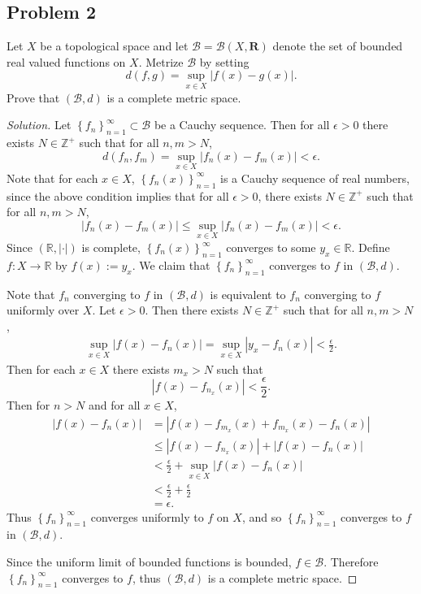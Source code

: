 \documentclass[12pt]{article}
\newcommand{\z}{\mathbb{Z}}
\newcommand{\real}{\mathbb{R}}
\newcommand\setb[1]{\left \{ #1 \right \}}
\theoremstyle{definition}
\begin{document}
\subsection{Problem 2}
Let $X$ be a topological space and let $\mathcal{B} = \mathcal{B}(X,\mathbf{R})$ denote the set of bounded real valued functions on $X$. Metrize $\mathcal{B}$ by setting 
\[
    d(f,g) = \sup\limits_{x \in X} |f(x) - g(x)|.
\]
Prove that $(\mathcal{B},d)$ is a complete metric space.
\begin{proof}[Solution]
    Let $\setb{ f_n }_{n = 1}^{\infty} \subset \mathcal{B}$ be a Cauchy sequence. Then for all $\epsilon > 0$ there exists $N \in \z^+$ such that for all $n , m > N$, 
    \[
        d(f_n , f_m) = \sup\limits_{x \in X} \left| f_n(x) - f_m(x) \right| < \epsilon.
    \]
    Note that for each $x \in X$, $\setb{ f_n(x) }_{n = 1}^{\infty}$ is a Cauchy sequence of real numbers, since the above condition implies that for all $\epsilon > 0$, there exists $N \in \z^+$ such that for all $n , m > N$,
    \[
        | f_n(x) - f_m(x) | \leq \sup\limits_{x \in X} \left| f_n(x) - f_m(x) \right| < \epsilon.
    \]
    Since $(\real, | \cdot |)$ is complete, $\setb{ f_n(x) }_{n = 1}^{\infty}$ converges to some $y_x \in \real$. Define $f : X \to \real$ by $f(x) := y_x$. We claim that $\setb{ f_n }_{n=1}^{\infty}$ converges to $f$ in $(\mathcal{B},d)$. 
    
    Note that $f_n$ converging to $f$ in $(\mathcal{B},d)$ is equivalent to $f_n$ converging to $f$ uniformly over $X$. Let $\epsilon > 0$. Then there exists $N \in \z^+$ such that for all $n , m > N$, 
    \begin{align*}
        \sup\limits_{x \in X} | f(x) - f_n(x) | = \sup\limits_{x \in X} | y_x - f_n(x) | < \frac{\epsilon}{2}.
    \end{align*}
    Then for each $x \in X$ there exists $m_x > N$ such that
    \[
        \left| f(x) - f_{n_x}(x) \right| < \frac{\epsilon}{2}.
    \]
    Then for $n > N$ and for all $x \in X$,
    \begin{align*}
        | f(x) - f_n(x) | & = \left| f(x) - f_{m_x}(x)  + f_{m_x}(x) - f_n(x) \right| \\
        & \leq \left| f(x) - f_{n_x}(x) \right| + | f(x) - f_n(x) | \\
        & < \frac{\epsilon}{2} + \sup\limits_{x \in X} | f(x) - f_n(x) | \\
        & < \frac{\epsilon}{2} + \frac{\epsilon}{2} \\
        & = \epsilon.
    \end{align*}
    Thus $\setb{f_n}_{n=1}^{\infty}$ converges uniformly to $f$ on $X$, and so $\setb{f_n}_{n=1}^{\infty}$ converges to $f$ in $(\mathcal{B},d)$.
    
    Since the uniform limit of bounded functions is bounded, $f \in \mathcal{B}$. Therefore $\setb{f_n}_{n=1}^{\infty}$ converges to $f$, thus $(\mathcal{B},d)$ is a complete metric space.
\end{proof}
\end{document}
